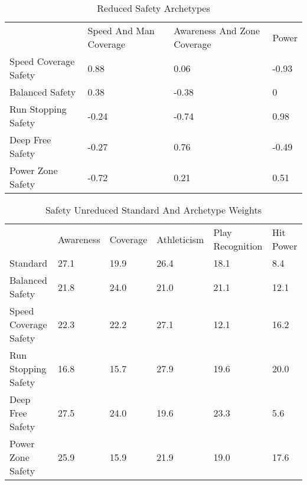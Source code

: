 \documentclass[11pt]{article}
\begin{document}
\begin{table}[]
\centering
\caption{Reduced Safety Archetypes}
\label{ReducedSafety}
\begin{tabular}{llll}
                      & Speed And Man Coverage & Awareness And Zone Coverage & Power \\
Speed Coverage Safety & 0.88                   & 0.06                        & -0.93 \\
Balanced Safety       & 0.38                   & -0.38                       & 0     \\
Run Stopping Safety   & -0.24                  & -0.74                       & 0.98  \\
Deep Free Safety      & -0.27                  & 0.76                        & -0.49 \\
Power Zone Safety     & -0.72                  & 0.21                        & 0.51 
\end{tabular}
\end{table}

\begin{table}[]
\centering
\caption{Safety Unreduced Standard And Archetype Weights}
\label{SafetyUnreducedWeights}
\begin{tabular}{llllll}
                      & Awareness & Coverage & Athleticism & Play Recognition & Hit Power \\
Standard              & 27.1      & 19.9     & 26.4        & 18.1             & 8.4       \\
Balanced Safety       & 21.8      & 24.0     & 21.0        & 21.1             & 12.1      \\
Speed Coverage Safety & 22.3      & 22.2     & 27.1        & 12.1             & 16.2      \\
Run Stopping Safety   & 16.8      & 15.7     & 27.9        & 19.6             & 20.0      \\
Deep Free Safety      & 27.5      & 24.0     & 19.6        & 23.3             & 5.6       \\
Power Zone Safety     & 25.9      & 15.9     & 21.9        & 19.0             & 17.6     
\end{tabular}
\end{table}
\end{document}
